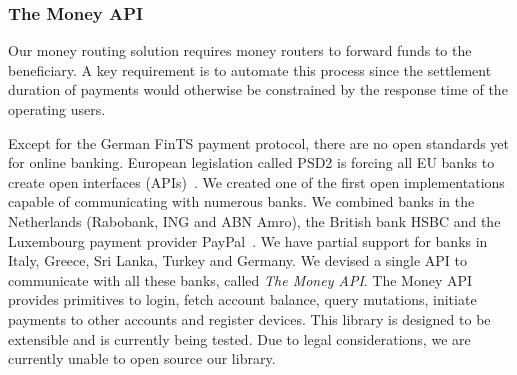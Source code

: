 \subsubsection*{The Money API}
Our money routing solution requires money routers to forward funds to the beneficiary.
A key requirement is to automate this process since the settlement duration of payments would otherwise be constrained by the response time of the operating users.

Except for the German FinTS payment protocol, there are no open standards yet for online banking.
European legislation called PSD2 is forcing all EU banks to create open interfaces (APIs)~\cite{cortet2016psd2}.
We created one of the first open implementations capable of communicating with numerous banks. %
We combined banks in the Netherlands (Rabobank, ING and ABN Amro), the British bank HSBC and the Luxembourg payment provider PayPal~\cite{doe2015vulnerability,awesome2015vulnerability}.
We have partial support for banks in Italy, Greece, Sri Lanka, Turkey and Germany.
We devised a single API to communicate with all these banks, called \emph{The Money API}.
The Money API provides primitives to login, fetch account balance, query mutations, initiate payments to other accounts and register devices.
This library is designed to be extensible and is currently being tested.
Due to legal considerations, we are currently unable to open source our library.


